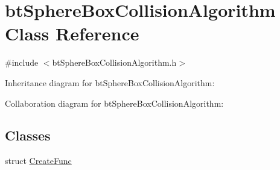 \hypertarget{classbt_sphere_box_collision_algorithm}{\section{bt\+Sphere\+Box\+Collision\+Algorithm Class Reference}
\label{classbt_sphere_box_collision_algorithm}
}


{\ttfamily \#include $<$bt\+Sphere\+Box\+Collision\+Algorithm.\+h$>$}



Inheritance diagram for bt\+Sphere\+Box\+Collision\+Algorithm\+:


Collaboration diagram for bt\+Sphere\+Box\+Collision\+Algorithm\+:
\subsection*{Classes}
\begin{DoxyCompactItemize}
\item 
struct \hyperlink{structbt_sphere_box_collision_algorithm_1_1_create_func}{Create\+Func}
\end{DoxyCompactItemize}
